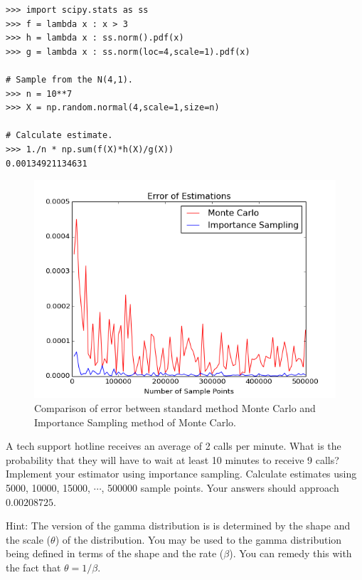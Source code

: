 \begin{lstlisting}
>>> import scipy.stats as ss
>>> f = lambda x : x > 3
>>> h = lambda x : ss.norm().pdf(x)
>>> g = lambda x : ss.norm(loc=4,scale=1).pdf(x)

# Sample from the N(4,1).
>>> n = 10**7
>>> X = np.random.normal(4,scale=1,size=n)

# Calculate estimate.
>>> 1./n * np.sum(f(X)*h(X)/g(X))
0.00134921134631
\end{lstlisting}

\begin{figure}[H]
\includegraphics[width=\textwidth]{MCvsIS.png}
\caption{Comparison of error between standard method Monte Carlo and Importance Sampling method of Monte Carlo.}
\label{fig:compare}
\end{figure}

\begin{problem} \label{prob:gamma}
A tech support hotline receives an average of 2 calls per minute. What is the probability that they will have to wait at least 10 minutes to receive 9 calls? Implement your estimator using importance sampling. Calculate estimates using 5000, 10000, 15000, $\cdots$, 500000 sample points. Your answers should approach $0.00208725$.

Hint: The version of the gamma distribution is  is determined by the shape and the scale ($\theta$) of the distribution. You may be used to the gamma distribution being defined in terms of the shape and the rate ($\beta$). You can remedy this with the fact that $\theta = 1/\beta$.
\end{problem}

